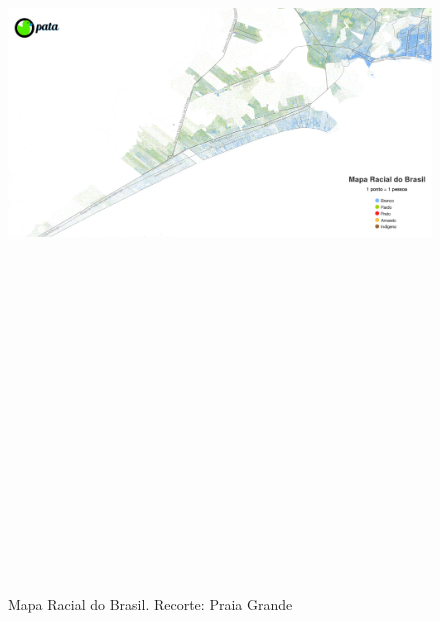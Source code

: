 	\begin{landscape}
		\begin{figure}[h]
			\centering
			\caption{Mapa Racial do Brasil. Recorte: Praia Grande}
			\includegraphics[width=25cm,height=24cm,keepaspectratio]{img/mapa_racial.png}
			\label{mapa_racial_pata}
		\end{figure}
	\end{landscape}
	
